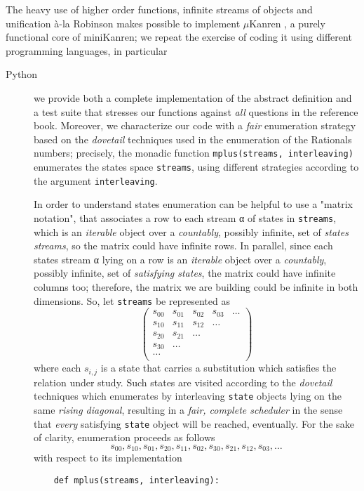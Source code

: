The heavy use of higher order functions, infinite streams of objects and
unification \`a-la Robinson makes possible to implement $\mu$Kanren
\citep{Hemann:muKanren}, a purely functional core of miniKanren; we repeat the
exercise of coding it using different programming languages, in particular
\begin{description}
\item[Python]
    we provide both a complete implementation of the abstract definition and a
    test suite that stresses our functions against \textit{all} questions in the
    reference book. Moreover, we characterize our code with a \textit{fair}
    enumeration strategy based on the \textit{dovetail} techniques used in the
    enumeration of the Rationals numbers; precisely, the monadic function
    \verb|mplus(streams, interleaving)| enumerates the states space
    \verb|streams|, using different strategies according to the argument
    \verb|interleaving|.

    In order to understand states enumeration can be helpful to use a "matrix
    notation", that associates a row to each stream α of states in
    \verb|streams|, which is an \textit{iterable} object over a \textit{countably},
    possibly infinite, set of \textit{states streams}, so the matrix could have
    infinite rows.  In parallel, since each states stream α lying on a row is an
    \textit{iterable} object over a \textit{countably}, possibly infinite, set of
    \textit{satisfying states}, the matrix could have infinite columns too;
    therefore, the matrix we are building could be infinite in both dimensions.
    So, let \verb|streams| be represented as
    \begin{displaymath}
        \left(\begin{array}{ccccc}
        s_{00} & s_{01} & s_{02} & s_{03} & \ldots \\
        s_{10} & s_{11} & s_{12} & \ldots &        \\
        s_{20} & s_{21} & \ldots &        &        \\
        s_{30} & \ldots &        &        &        \\
        \ldots &        &        &        &        \\
        \end{array}\right)
    \end{displaymath}
    where each $s_{i,j}$ is a state that carries a substitution which satisfies
    the relation under study.  Such states are visited according to the
    \textit{dovetail} techniques which enumerates by interleaving \verb|state|
    objects lying on the same \textit{rising diagonal}, resulting in a
    \textit{fair, complete scheduler} in the sense that \textit{every} satisfying
    \verb|state| object will be reached, eventually. For the sake of clarity,
    enumeration proceeds as follows
    \begin{displaymath}
    s_{00}, s_{10}, s_{01}, s_{20}, s_{11}, s_{02}, s_{30}, s_{21},
    s_{12}, s_{03}, \ldots
    \end{displaymath}
    with respect to its implementation
    \begin{verbatim}
    def mplus(streams, interleaving):


\end{verbatim}
\end{description}
